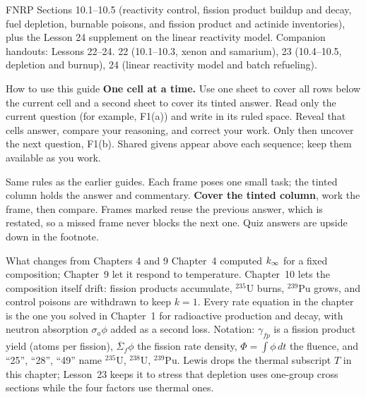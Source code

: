 \documentclass[compact]{ne630handout}
\newcommand{\iso}[2]{\ensuremath{{}^{#1}\mathrm{#2}}}
\newcommand{\Sf}{\overline\Sigma_f}
\newcommand{\gfp}{\gamma_{fp}}
\begin{document}
 {FNRP Sections 10.1--10.5 (reactivity control, fission product buildup and decay, fuel depletion, burnable poisons, and fission product and actinide inventories), plus the Lesson 24 supplement on the linear reactivity model. Companion handouts: Lessons 22--24.}
 {22 (10.1--10.3, xenon and samarium), 23 (10.4--10.5, depletion and burnup), 24 (linear reactivity model and batch refueling).}

\begin{KeyBox}{How to use this guide}
\ifguidehandwriting
\textbf{One cell at a time.} Use one sheet to cover all rows below the current cell and a second sheet to cover its tinted answer. Read only the current question (for example, F1(a)) and write in its ruled space. Reveal that cell\textquotesingle s answer, compare your reasoning, and correct your work. Only then uncover the next question, F1(b). Shared givens appear above each sequence; keep them available as you work.\par\smallskip
\fi
Same rules as the earlier guides. Each frame poses one small task; the tinted column holds the answer and commentary. \textbf{Cover the tinted column}, work the frame, then compare. Frames marked \Chain reuse the previous answer, which is restated, so a missed frame never blocks the next one. Quiz answers are upside down in the footnote.
\end{KeyBox}

\begin{KeyBox}{What changes from Chapters 4 and 9}
Chapter~4 computed $k_\infty$ for a fixed composition; Chapter~9 let it respond to temperature. Chapter~10 lets the composition itself drift: fission products accumulate, \iso{235}{U} burns, \iso{239}{Pu} grows, and control poisons are withdrawn to keep $k=1$. Every rate equation in the chapter is the one you solved in Chapter~1 for radioactive production and decay, with neutron absorption $\sigma_a\phi$ added as a second loss. Notation: $\gfp$ is a fission product yield (atoms per fission), $\Sf\phi$ the fission rate density, $\Phi=\int\phi\,dt$ the fluence, and ``25'', ``28'', ``49'' name \iso{235}{U}, \iso{238}{U}, \iso{239}{Pu}. Lewis drops the thermal subscript $T$ in this chapter; Lesson~23 keeps it to stress that depletion uses one-group cross sections while the four factors use thermal ones.
\end{KeyBox}
\end{document}
